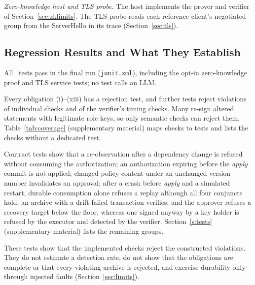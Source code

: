 \emph{Zero-knowledge host and TLS probe.} The host implements the prover and verifier of Section~\ref{sec:zklimits}. The TLS probe reads each reference client's negotiated group from the ServerHello in its trace (Section~\ref{sec:tls}).

\subsection{Regression Results and What They Establish}
\label{sec:tests}
All \NumTests\ tests pass in the final run (\texttt{junit.xml}), including the opt-in zero-knowledge proof and TLS service tests; no test calls an LLM.

Every obligation (i)--(xiii) has a rejection test, and further tests reject violations of individual checks and of the verifier's timing checks. Many re-sign altered statements with legitimate role keys, so only semantic checks can reject them. Table~\ref{tab:coverage} (supplementary material) maps checks to tests and lists the checks without a dedicated test.

Contract tests show that a re-observation after a dependency change is refused without consuming the authorization; an authorization expiring before the \emph{apply} commit is not applied; changed policy content under an unchanged version number invalidates an approval; after a crash before \emph{apply} and a simulated restart, durable consumption alone refuses a replay although all four conjuncts hold; an archive with a drift-failed transaction verifies; and the approver refuses a recovery target below the floor, whereas one signed anyway by a key holder is refused by the executor and detected by the verifier. Section~\ref{s:tests} (supplementary material) lists the remaining groups.

These tests show that the implemented checks reject the constructed violations. They do not estimate a detection rate, do not show that the obligations are complete or that every violating archive is rejected, and exercise durability only through injected faults (Section~\ref{sec:limits}).
